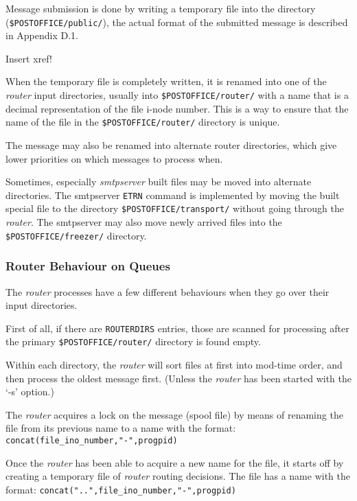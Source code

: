 Message submission is done by writing a temporary file
into the directory ({\tt \$POSTOFFICE/public/}), the 
actual format of the submitted message is described in Appendix D.1.

Insert xref!

When the temporary file is completely written, it is renamed into one 
of the {\em router\/} input directories, usually into 
{\tt \$POSTOFFICE/router/} with a name that is a decimal representation
of the file i-node number. This is a way to ensure that the
name of the file in the {\tt \$POSTOFFICE/router/} directory is unique.

The message may also be renamed into alternate router directories, 
which give lower priorities on which messages to process when.

Sometimes, especially {\em smtpserver\/} built files may be moved
into alternate directories. The smtpserver {\tt ETRN}
command is implemented by moving the built special file to the 
directory {\tt \$POSTOFFICE/transport/} without going through the
{\em router\/}.  The smtpserver may also move newly arrived
files into the {\tt \$POSTOFFICE/freezer/} directory.




\subsubsection{Router Behaviour on Queues}



The {\em router\/} processes have a few different behaviours when
they go over their input directories.

First of all, if there are {\tt ROUTERDIRS} entries, those
are scanned for processing after the primary 
{\tt \$POSTOFFICE/router/} directory is found empty.

Within each directory, the {\em router\/} will sort files at first into 
mod-time order, and then process the oldest message first. (Unless the 
{\em router\/} has been started with the `-s' option.)

The {\em router\/} acquires a lock on the message (spool file) by means
of renaming the file from its previous name to a name with the format: 
{\tt concat(file\_ino\_number,"-",progpid)}

Once the {\em router\/} has been able to acquire a new name
for the file, it starts off by creating a temporary file of
{\em router\/} routing decisions.  The file has a name with the format:
{\tt concat("..",file\_ino\_number,"-",progpid)}

